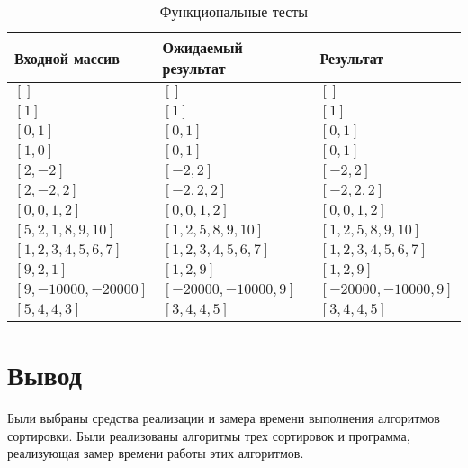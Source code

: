 \begin{table}[h]
	\begin{center}
	\begin{threeparttable}
	\captionsetup{justification=raggedright,singlelinecheck=off}
	\caption{\label{tbl:functional_test} Функциональные тесты}
		\begin{tabular}{|l|l|l|}
			\hline
			Входной массив & Ожидаемый результат & Результат \\ 
			\hline
			$[]$  & $[]$  & $[]$\\
			$[1]$  & $[1]$  & $[1]$\\
			$[0, 1]$  & $[0, 1]$  & $[0, 1]$\\
			$[1, 0]$  & $[0, 1]$  & $[0, 1]$\\
			$[2, -2]$  & $[-2, 2]$  & $[-2, 2]$\\
			$[2, -2, 2]$  & $[-2, 2, 2]$  & $[-2, 2, 2]$\\
			$[0, 0, 1, 2]$  & $[0, 0, 1, 2]$  & $[0, 0, 1, 2]$\\
			$[5, 2, 1, 8, 9, 10]$  & $[1, 2, 5, 8, 9, 10]$  & $[1, 2, 5, 8, 9, 10]$\\
			$[1, 2, 3, 4, 5, 6, 7]$  & $[1, 2, 3, 4, 5, 6, 7]$  & $[1, 2, 3, 4, 5, 6, 7]$\\
			$[9, 2, 1]$  & $[1, 2, 9]$  & $[1, 2, 9]$\\
			$[9, -10000, -20000]$  & $[-20000, -10000, 9]$  & $[-20000, -10000, 9]$\\
			$[5, 4, 4, 3]$  & $[3, 4, 4, 5]$  & $[3, 4, 4, 5]$\\
			\hline
		\end{tabular}
	\end{threeparttable}
	\end{center}
\end{table}

\section*{Вывод}

Были выбраны средства реализации и замера времени выполнения алгоритмов сортировки. Были реализованы алгоритмы трех сортировок и программа, реализующая замер времени работы этих алгоритмов.
